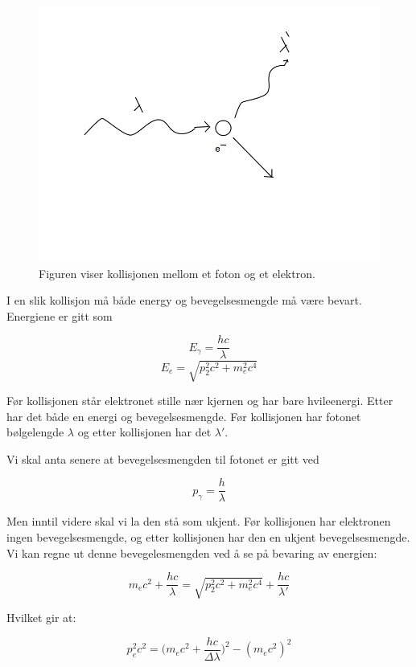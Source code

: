 \documentclass[a4paper,norsk, 10pt]{article}
\begin{document}
\begin{figure}[H]
\centering
\includegraphics[scale=.3]{comptonLambda.png}
\caption{Figuren viser kollisjonen mellom et foton og et elektron.}\label{fig::photonElectronCollision}
\end{figure}

I en slik kollisjon må både energy og bevegelsesmengde må være bevart. Energiene er gitt som

$$
E_{\gamma} = \frac{hc}{\lambda}
$$
$$
E_e = \sqrt{p_2^2c^2 + m_e^2c^4}
$$

Før kollisjonen står elektronet stille nær kjernen og har bare hvileenergi. Etter har det både en energi og bevegelsesmengde. Før kollisjonen har fotonet bølgelengde $\lambda$ og etter kollisjonen har det $\lambda'$.

Vi skal anta senere at bevegelsesmengden til fotonet er gitt ved

$$
p_{\gamma} = \frac{h}{\lambda}
$$

Men inntil videre skal vi la den stå som ukjent. Før kollisjonen har elektronen ingen bevegelsesmengde, og etter kollisjonen har den en ukjent bevegelsesmengde. Vi kan regne ut denne bevegelesmengden ved å se på bevaring av energien:

$$
m_ec^2 + \frac{hc}{\lambda} = \sqrt{p_2^2c^2 + m_e^2c^4} + \frac{hc}{\lambda'}
$$

Hvilket gir at:

\begin{equation}
p_e^2c^2 = \big(m_ec^2 + \frac{hc}{\Delta \lambda} \big)^2 - (m_ec^2)^2
\end{equation}\label{eq::p2c2}
\end{document}

